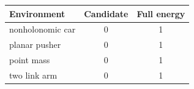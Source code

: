 \begin{tabular}{lcc}\toprule
Environment & Candidate & Full energy\\\midrule
nonholonomic car & 0 & 1\\
planar pusher & 0 & 1\\
point mass & 0 & 1\\
two link arm & 0 & 1\\
\bottomrule\end{tabular}
